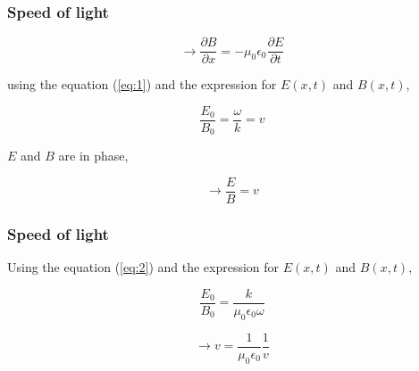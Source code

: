 \documentclass[]{beamer}
\begin{document}
\begin{frame}

\frametitle{Speed of light}






\begin{equation}
\rightarrow  \frac{\partial B}{\partial x}=-\mu_0\epsilon_0 \frac{\partial E}{\partial t}
\label{eq:2}
\end{equation}

\pause
\vspace{3mm}

using the equation (\ref{eq:1}) and the expression for $E(x,t)$ and $B(x,t)$,
\pause

\begin{equation*}
\frac{E_0}{B_0}=\frac{\omega}{k}=v
\end{equation*}
\pause

$E$ and $B$ are in phase,

\pause

\begin{equation*}
\rightarrow \frac{E}{B}=v
\end{equation*}

  \end{frame}









\begin{frame}

\frametitle{Speed of light}



Using the equation (\ref{eq:2}) and the expression for $E(x,t)$ and $B(x,t)$,
\pause

\begin{equation*}
\frac{E_0}{B_0}=\frac{k}{\mu_0\epsilon_0\omega}
\end{equation*}
\pause



\begin{equation*}
\rightarrow v=\frac{1}{\mu_0\epsilon_0}\frac{1}{v}
\end{equation*}



  \end{frame}






\end{document}
